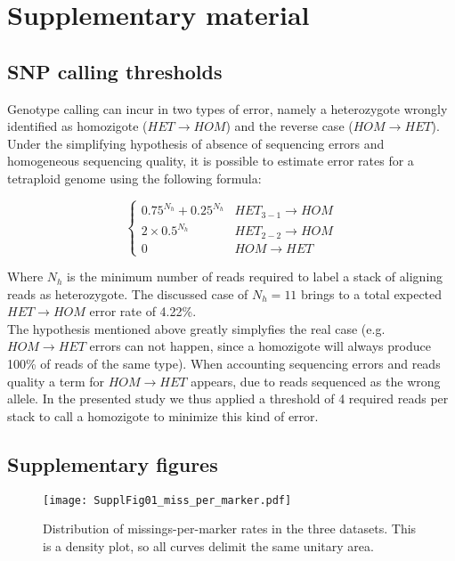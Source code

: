 \section{Supplementary material}
\label{sec:supplementary_material}

\subsection{SNP calling thresholds}
\label{sec:SNP_calling_thresholds}
Genotype calling can incur in two types of error, namely a heterozygote wrongly identified as homozigote ($HET \rightarrow HOM$) and the reverse case ($HOM \rightarrow HET$). 
Under the simplifying hypothesis of absence of sequencing errors and homogeneous sequencing quality, it is possible to estimate error rates for a tetraploid genome using the following formula:

\begin{equation}
\begin{cases}
0.75^{N_h} + 0.25^{N_h} & HET_{3-1} \rightarrow HOM \\ 
2 \times 0.5^{N_h}      & HET_{2-2} \rightarrow HOM \\ 
0                       & HOM \rightarrow HET
\end{cases}
\end{equation}

Where $N_h$ is the minimum number of reads required to label a stack of aligning reads as heterozygote. The discussed case of $N_h = 11$ brings to a total expected $HET \rightarrow HOM$ error rate of 4.22\%.\\
The hypothesis mentioned above greatly simplyfies the real case (e.g. $HOM \rightarrow HET$ errors can not happen, since a homozigote will always produce 100\% of reads of the same type). When accounting sequencing errors and reads quality a term for $HOM \rightarrow HET$ appears, due to reads sequenced as the wrong allele. In the presented study we thus applied a threshold of 4 required reads per stack to call a homozigote to minimize this kind of error.

\subsection{Supplementary figures}
\label{sec:supplementary_figures}

\begin{figure}\texttt{[image: SupplFig01\_miss\_per\_marker.pdf]}
\caption{Distribution of missings-per-marker rates in the three datasets. This is a
density plot, so all curves delimit the same unitary area.}
\end{figure}

